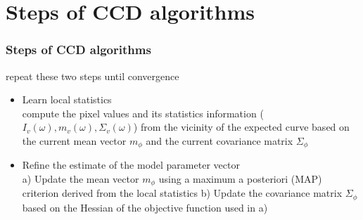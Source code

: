 \documentclass[english,10pt,presentation]{beamer}
\begin{document}
\section{Steps of CCD algorithms}
\label{sec-3}
\begin{frame}
\frametitle{Steps of CCD algorithms}
\label{sec-3_1}
\begin{alertblock}{repeat these two steps until convergence}
\label{sec-3_1_1}
\begin{itemize}

\item Learn local statistics\\
\label{sec-3_1_1_1}%
compute the pixel values and its statistics information ($I_v(\omega), m_{v}(\omega), \Sigma_v(\omega)$) from the vicinity of the expected curve based on
the current mean vector $m_{\phi}$ and the current covariance matrix $\Sigma_{\phi}$

\item Refine the estimate of the model parameter vector\\
\label{sec-3_1_1_2}%
a) Update the mean vector $m_{\phi}$ using a maximum a posteriori (MAP) criterion derived
from the local statistics
b) Update the covariance matrix $\Sigma_{\phi}$ based on the Hessian of the objective function used
in a) 



\end{itemize} %
\end{alertblock}
\end{frame}
\end{document}
